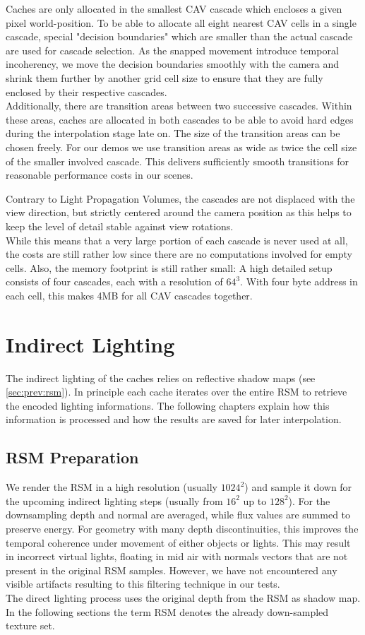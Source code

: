 \documentclass[thesis.tex]{subfiles}
\begin{document}
Caches are only allocated in the smallest CAV cascade which encloses a given pixel world-position.
To be able to allocate all eight nearest CAV cells in a single cascade, special "decision boundaries" which are smaller than the actual cascade are used for cascade selection.
As the snapped movement introduce temporal incoherency, we move the decision boundaries smoothly with the camera and shrink them further by another grid cell size to ensure that they are fully enclosed by their respective cascades.
\\
Additionally, there are transition areas between two successive cascades.
Within these areas, caches are allocated in both cascades to be able to avoid hard edges during the interpolation stage late on.
The size of the transition areas can be chosen freely.
For our demos we use transition areas as wide as twice the cell size of the smaller involved cascade.
This delivers sufficiently smooth transitions for reasonable performance costs in our scenes.

Contrary to Light Propagation Volumes, the cascades are not displaced with the view direction, but strictly centered around the camera position as this helps to keep the level of detail stable against view rotations.\\
While this means that a very large portion of each cascade is never used at all, the costs are still rather low since there are no computations involved for empty cells.
Also, the memory footprint is still rather small: %
A high detailed setup consists of four cascades, each with a resolution of $64^3$.
With four byte address in each cell, this makes 4MB for all CAV cascades together.

\section{Indirect Lighting}
The indirect lighting of the caches relies on reflective shadow maps (see \autoref{sec:prev:rsm}).
In principle each cache iterates over the entire RSM to retrieve the encoded lighting informations.
The following chapters explain how this information is processed and how the results are saved for later interpolation.

\subsection{RSM Preparation}
We render the RSM in a high resolution (usually $1024^2$) and sample it down for the upcoming indirect lighting steps (usually from $16^2$ up to $128^2$).
For the downsampling depth and normal are averaged, while flux values are summed to preserve energy.
For geometry with many depth discontinuities, this improves the temporal coherence under movement of either objects or lights.
This may result in incorrect virtual lights, floating in mid air with normals vectors that are not present in the original RSM samples.
However, we have not encountered any visible artifacts resulting to this filtering technique in our tests.
\\
The direct lighting process uses the original depth from the RSM as shadow map.
In the following sections the term RSM denotes the already down-sampled texture set.
\end{document}
